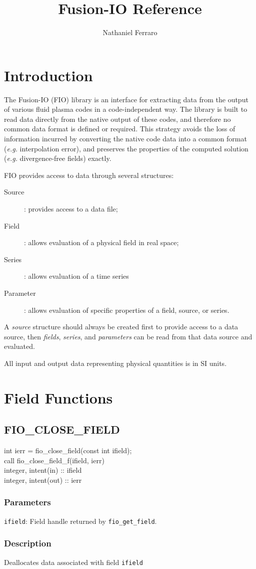 \documentclass{article}
\title{Fusion-IO Reference}
\author{Nathaniel Ferraro}
\newcommand{\parameter}[2]{\noindent \texttt{#1}: #2}
\newcommand{\function}[4]{
  \subsection{\uppercase{#1}}

  #2

  \subsubsection{Parameters}
  #3

  \subsubsection{Description}
  #4
}
\begin{document}
\maketitle

\tableofcontents

\section{Introduction}

The Fusion-IO (FIO) library is an interface for extracting data from the
output of various fluid plasma codes in a code-independent way.  The
library is built to read data directly from the native output of these
codes, and therefore no common data format is defined or required.
This strategy avoids the loss of information incurred by converting
the native code data into a common format (\textit{e.g.} interpolation
error), and preserves the properties of the computed solution
(\textit{e.g.} divergence-free fields) exactly.

FIO provides access to data through several structures:
\begin{description}
\item[Source]: provides access to a data file;
\item[Field]: allows evaluation of a physical field in real space;
\item[Series]: allows evaluation of a time series
\item[Parameter]: allows evaluation of specific properties of a field,
  source, or series.
\end{description}
A \textit{source} structure should always be created first to provide
access to a data source, then \textit{fields}, \textit{series}, and
\textit{parameters} can be read from that data source and evaluated.

All input and output data representing physical quantities is in SI units.

\section{Field Functions}

\function{fio\_close\_field}{
\noindent
int ierr = fio\_close\_field(const int ifield);\\

\noindent
call fio\_close\_field\_f(ifield, ierr)\\
integer, intent(in) :: ifield\\
integer, intent(out) :: ierr
}
{
\parameter{ifield}{Field handle returned by \texttt{fio\_get\_field}.}
}
{
Deallocates data associated with field \texttt{ifield}
}
\end{document}
